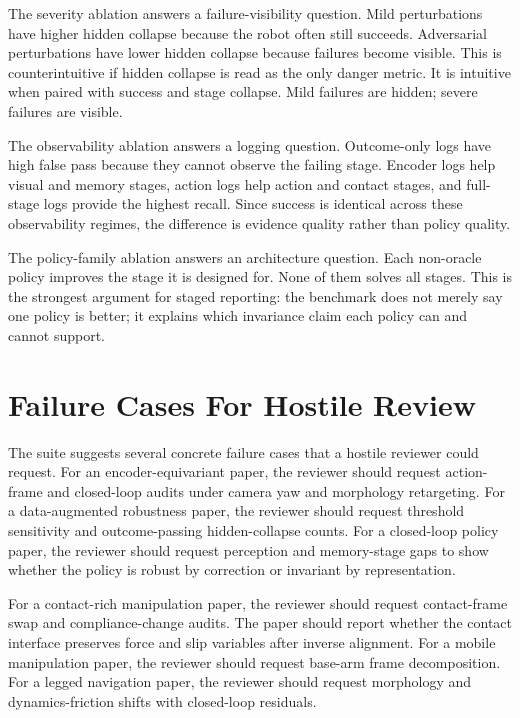 \documentclass{article}
\begin{document}
The severity ablation answers a failure-visibility question. Mild perturbations have higher hidden collapse because the robot often still succeeds. Adversarial perturbations have lower hidden collapse because failures become visible. This is counterintuitive if hidden collapse is read as the only danger metric. It is intuitive when paired with success and stage collapse. Mild failures are hidden; severe failures are visible.

The observability ablation answers a logging question. Outcome-only logs have high false pass because they cannot observe the failing stage. Encoder logs help visual and memory stages, action logs help action and contact stages, and full-stage logs provide the highest recall. Since success is identical across these observability regimes, the difference is evidence quality rather than policy quality.

The policy-family ablation answers an architecture question. Each non-oracle policy improves the stage it is designed for. None of them solves all stages. This is the strongest argument for staged reporting: the benchmark does not merely say one policy is better; it explains which invariance claim each policy can and cannot support.

\section{Failure Cases For Hostile Review}

The suite suggests several concrete failure cases that a hostile reviewer could request. For an encoder-equivariant paper, the reviewer should request action-frame and closed-loop audits under camera yaw and morphology retargeting. For a data-augmented robustness paper, the reviewer should request threshold sensitivity and outcome-passing hidden-collapse counts. For a closed-loop policy paper, the reviewer should request perception and memory-stage gaps to show whether the policy is robust by correction or invariant by representation.

For a contact-rich manipulation paper, the reviewer should request contact-frame swap and compliance-change audits. The paper should report whether the contact interface preserves force and slip variables after inverse alignment. For a mobile manipulation paper, the reviewer should request base-arm frame decomposition. For a legged navigation paper, the reviewer should request morphology and dynamics-friction shifts with closed-loop residuals.
\end{document}
